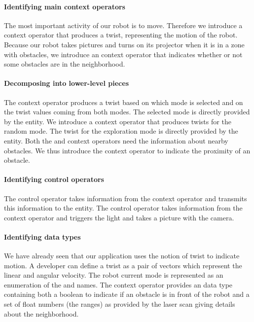 \paragraph*{Identifying main context operators}
The most important activity of our robot is to move. Therefore we
introduce a  context operator that produces a twist,
representing the motion of the robot. Because our robot takes pictures and
turns on its projector when it is in a zone with obstacles, we
introduce an  context operator that indicates whether
or not some obstacles are in the neighborhood.

\paragraph*{Decomposing into lower-level pieces}
The  context operator produces a twist based on which mode
is selected and on the twist values coming from both modes. The
selected mode is directly provided by the  entity. We
introduce a  context operator that produces twists
for the random mode. The twist for the exploration mode is directly
provided by the  entity. Both the 
and  context operators need the information about
nearby obstacles. We thus introduce the  context
operator to indicate the proximity of an obstacle.

\paragraph*{Identifying control operators}
The  control operator takes information from the
 context operator and transmits this information to the
 entity. The  control operator takes
information from the  context operator and triggers the
light and takes a picture with the camera.

\paragraph*{Identifying data types}
We have already seen that our application uses the notion of twist to
indicate motion. A developer can define a twist as a pair of vectors
which represent the linear and angular velocity. The robot current
mode is represented as an enumeration of the  and
 names. The  context operator
provides an  data type containing both a boolean to
indicate if an obstacle is in front of the robot and a set of float
numbers (the ranges) as provided by the laser scan giving details
about the neighborhood.

